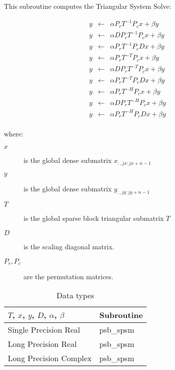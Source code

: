 %
%



This subroutine computes the Triangular System Solve:

\begin{eqnarray*}
y &\leftarrow& \alpha P_r T^{-1} P_c x + \beta y\\
y &\leftarrow& \alpha D P_r T^{-1} P_c x + \beta y\\
y &\leftarrow& \alpha P_r T^{-1} P_c D x + \beta y\\
y &\leftarrow& \alpha P_r T^{-T} P_c x + \beta y\\
y &\leftarrow& \alpha D P_r T^{-T} P_c x + \beta y\\
y &\leftarrow& \alpha P_r T^{-T} P_c D x + \beta y\\
y &\leftarrow& \alpha P_r T^{-H} P_c x + \beta y\\
y &\leftarrow& \alpha D P_r T^{-H} P_c x + \beta y\\
y &\leftarrow& \alpha P_r T^{-H} P_c D x + \beta y\\
\end{eqnarray*}


where:
\begin{description}
\item[$x$] is the global dense submatrix $x_{:, jx:jx+n-1}$
\item[$y$] is the global dense submatrix $y_{:, jy:jy+n-1}$
\item[$T$] is the global sparse block triangular submatrix $T$
\item[$D$] is the scaling diagonal matrix.
\item[$P_r, P_c$] are the permutation matrices.
\end{description}


\begin{table}[h]
\begin{center}
\begin{tabular}{ll}
\hline
$T$, $x$, $y$, $D$, $\alpha$, $\beta$ & {\bf Subroutine}\\
\hline
Single Precision Real & psb\_spsm\\
Long Precision Real & psb\_spsm \\
Long Precision Complex & psb\_spsm \\
\hline
\end{tabular}
\end{center}
\caption{Data types\label{tab:f90spsm}}
\end{table}



